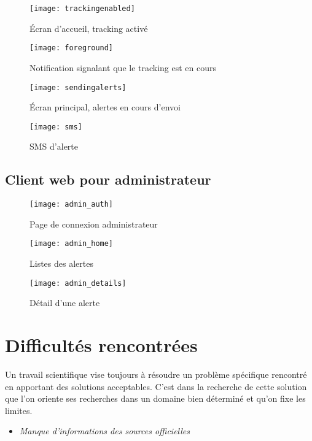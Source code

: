 \begin{figure}[H]
	\centering
	\texttt{[image: trackingenabled]}
	\caption{Écran d'accueil, tracking activé}
\end{figure}

\begin{figure}[H]
	\centering
	\texttt{[image: foreground]}
	\caption{Notification signalant que le tracking est en cours}
\end{figure}

\begin{figure}[H]
	\centering
	\texttt{[image: sendingalerts]}
	\caption{Écran principal, alertes en cours d’envoi}
\end{figure}

\begin{figure}[H]
	\centering
	\texttt{[image: sms]}
	\caption{SMS d’alerte}
\end{figure}

\subsection{Client web pour administrateur}

\begin{figure}[H]
	\centering
	\texttt{[image: admin\_auth]}
	\caption{Page de connexion administrateur}
\end{figure}

\begin{figure}[H]
	\centering
	\texttt{[image: admin\_home]}
	\caption{Listes des alertes}
\end{figure}

\begin{figure}[H]
	\centering
	\texttt{[image: admin\_details]}
	\caption{Détail d’une alerte}
\end{figure}

\section{Difficultés rencontrées}
Un travail scientifique vise toujours à résoudre un problème spécifique rencontré en apportant des solutions acceptables. C’est dans la recherche de cette solution que l’on oriente ses recherches dans un domaine bien déterminé et qu’on fixe les limites.

\begin{itemize}
	\item \textit{Manque d'informations des sources officielles }
\end{itemize}

